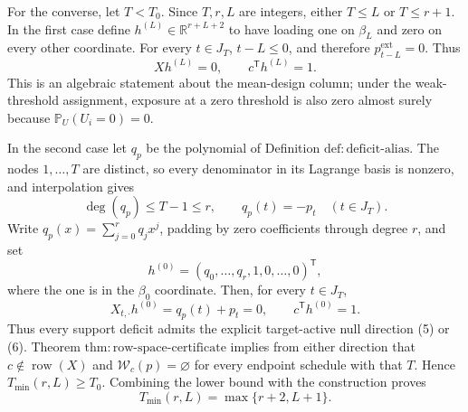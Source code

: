 For the converse, let \(T<T_0\).  Since \(T,r,L\) are integers, either \(T\le L\) or \(T\le r+1\).  In the first case define \(h^{(L)}\in\mathbb R^{r+L+2}\) to have loading one on \(\beta_L\) and zero on every other coordinate.  For every \(t\in J_T\), \(t-L\le0\), and therefore \(p_{t-L}^{\mathrm{ext}}=0\).  Thus
\[
 Xh^{(L)}=0,
 \qquad c^{\mathsf T}h^{(L)}=1.
 \tag{5}
\]
This is an algebraic statement about the mean-design column; under the weak-threshold assignment, exposure at a zero threshold is also zero almost surely because \(\mathbb P_U(U_i=0)=0\).

In the second case let \(q_p\) be the polynomial of Definition \(\mathrm{def:deficit\text{-}alias}\).  The nodes \(1,\ldots,T\) are distinct, so every denominator in its Lagrange basis is nonzero, and interpolation gives
\[
 \deg(q_p)\le T-1\le r,
 \qquad q_p(t)=-p_t\quad(t\in J_T).
\]
Write \(q_p(x)=\sum_{j=0}^{r}q_jx^j\), padding by zero coefficients through degree \(r\), and set
\[
 h^{(0)}=(q_0,\ldots,q_r,1,0,\ldots,0)^{\mathsf T},
\]
where the one is in the \(\beta_0\) coordinate.  Then, for every \(t\in J_T\),
\[
 X_{t,\cdot}h^{(0)}=q_p(t)+p_t=0,
 \qquad c^{\mathsf T}h^{(0)}=1.
 \tag{6}
\]
Thus every support deficit admits the explicit target-active null direction (5) or (6).  Theorem \(\mathrm{thm:row\text{-}space\text{-}certificate}\) implies from either direction that \(c\notin\operatorname{row}(X)\) and \(\mathcal W_c(p)=\varnothing\) for every endpoint schedule with that \(T\).  Hence \(T_{\min}(r,L)\ge T_0\).  Combining the lower bound with the construction proves
\[
 T_{\min}(r,L)=\max\{r+2,L+1\}.
\]